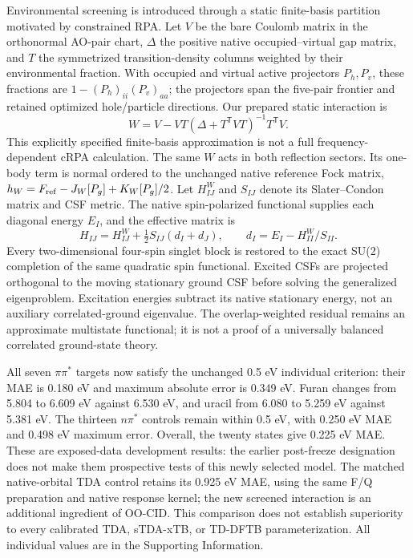 Environmental screening is introduced through a static finite-basis partition
motivated by constrained RPA.\cite{crpa2004} Let $V$ be the bare Coulomb
matrix in the orthonormal AO-pair chart, $\Delta$ the positive native
occupied--virtual gap matrix, and $T$ the symmetrized transition-density
columns weighted by their environmental fraction. With occupied and virtual
active projectors $P_h,P_v$, these fractions are
$1-(P_h)_{ii}(P_v)_{aa}$; the projectors span the five-pair frontier and
retained optimized hole/particle directions. Our prepared static interaction is
\begin{equation}
 W=V-VT(\Delta+T^{\mathsf T}VT)^{-1}T^{\mathsf T}V.
\end{equation}
This explicitly specified finite-basis approximation is not a full
frequency-dependent cRPA calculation. The same $W$ acts in both reflection
sectors. Its one-body term is normal ordered to the unchanged native reference
Fock matrix, $h_W=F_{\rm ref}-J_W[P_g]+K_W[P_g]/2$.
Let $H^W_{IJ}$ and $S_{IJ}$ denote its Slater--Condon matrix and CSF metric.
The native spin-polarized functional supplies each diagonal energy $E_I$,
and the effective matrix is
\begin{equation}
 H_{IJ}=H^W_{IJ}+\tfrac12S_{IJ}(d_I+d_J),\qquad
 d_I=E_I-H^W_{II}/S_{II}.
\end{equation}
Every two-dimensional four-spin singlet block is restored to the exact
SU(2) completion of the same quadratic spin functional. Excited CSFs are
projected orthogonal to the moving stationary ground CSF before solving
the generalized eigenproblem. Excitation energies subtract its native
stationary energy, not an auxiliary correlated-ground eigenvalue.
The overlap-weighted residual remains an approximate multistate functional;
it is not a proof of a universally balanced correlated ground-state theory.

All seven $\pi\pi^*$ targets now satisfy the unchanged 0.5 eV individual
criterion: their MAE is 0.180 eV and maximum absolute error is 0.349 eV.
Furan changes from 5.804 to 6.609 eV against 6.530 eV, and uracil from
6.080 to 5.259 eV against 5.381 eV. The thirteen $n\pi^*$ controls remain
within 0.5 eV, with 0.250 eV MAE and 0.498 eV maximum error. Overall,
the twenty states give 0.225 eV MAE. These are exposed-data development
results: the earlier post-freeze designation does not make them prospective
tests of this newly selected model. The matched native-orbital TDA control
retains its 0.925 eV MAE, using the same F/Q preparation and native response
kernel; the new screened interaction is an additional ingredient of OO-CID.
This comparison does not establish superiority to every calibrated TDA,
sTDA-xTB, or TD-DFTB parameterization. All individual values are in the
Supporting Information.

